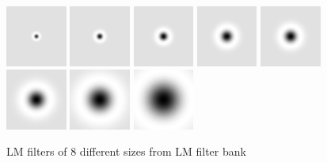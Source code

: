 \begin{figure}
\includegraphics[width=2.0cm]{figs/lmf1.png}
\includegraphics[width=2.0cm]{figs/lmf3.png}
\includegraphics[width=2.0cm]{figs/lmf5.png}
\includegraphics[width=2.0cm]{figs/lmf7.png}
\includegraphics[width=2.0cm]{figs/lmf2.png}
\includegraphics[width=2.0cm]{figs/lmf4.png}
\includegraphics[width=2.0cm]{figs/lmf6.png}
\includegraphics[width=2.0cm]{figs/lmf8.png}
\caption{LM filters of 8 different sizes from LM filter bank}
\label{fig:log_filters8}
\end{figure}



